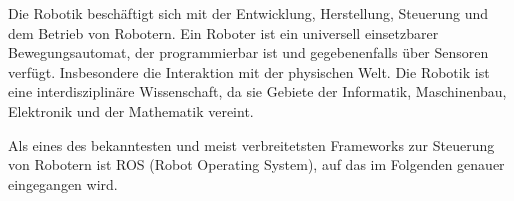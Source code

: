 \begin{flushleft}
    
    Die Robotik beschäftigt sich mit der Entwicklung, Herstellung, Steuerung und dem Betrieb von Robotern.
    Ein Roboter ist ein universell einsetzbarer Bewegungsautomat, der programmierbar ist und gegebenenfalls über Sensoren verfügt.
    Insbesondere die Interaktion mit der physischen Welt.
    Die Robotik ist eine interdisziplinäre Wissenschaft, da sie Gebiete der Informatik, Maschinenbau, Elektronik und der Mathematik vereint. 
    \cite{robotik_konradin}
    

    Als eines des bekanntesten und meist verbreitetsten Frameworks zur Steuerung von Robotern ist ROS (Robot Operating System), auf das im Folgenden genauer eingegangen wird.

\end{flushleft}